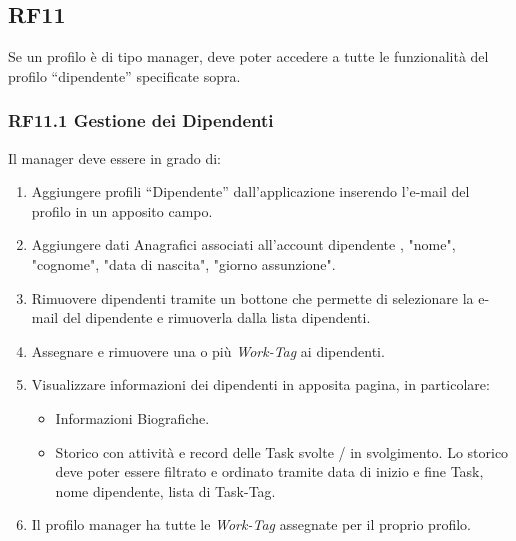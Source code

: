 \documentclass{report}
\begin{document}
\subsection*{RF11}
Se un profilo è di tipo manager, deve poter accedere a tutte le funzionalità del profilo “dipendente” specificate sopra.

\subsubsection*{RF11.1 Gestione dei Dipendenti}
Il manager deve essere in grado di:

\begin{enumerate}
	
	\item Aggiungere profili “Dipendente” dall’applicazione inserendo l’e-mail del profilo in un apposito campo.
	\item Aggiungere dati Anagrafici associati all'account dipendente , "nome", "cognome", "data di nascita", "giorno assunzione".
	\item Rimuovere dipendenti tramite un bottone che permette di selezionare la 
	e-mail del dipendente e rimuoverla dalla lista dipendenti.
	
	\item Assegnare e rimuovere una o più \textit{Work-Tag} ai dipendenti. 
	
	\item Visualizzare informazioni dei dipendenti in apposita pagina, in particolare:
	
	\begin{itemize}
		\item Informazioni Biografiche.
		\item Storico con attività e record delle Task svolte / in svolgimento. Lo storico deve poter essere filtrato e ordinato tramite data di inizio e fine Task, nome dipendente, lista di Task-Tag.
		
	\end{itemize}
	
	\item Il profilo manager ha tutte le \textit{Work-Tag} assegnate per il proprio profilo.
		
\end{enumerate}
\end{document}
